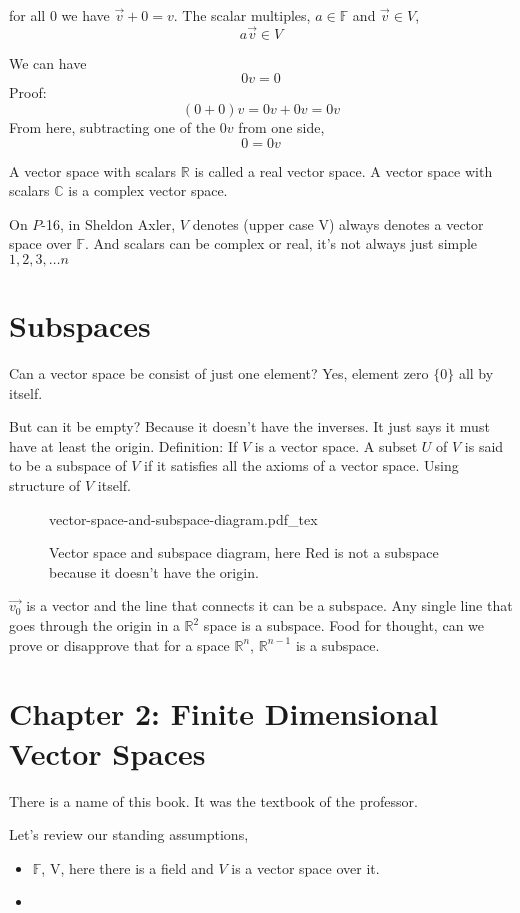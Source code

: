 \documentclass[a4paper]{article}
\newcommand{\incfig}[1]{%
	\def\svgwidth{\columnwidth}
	{#1.pdf_tex}
}
\begin{document}
for all $0$ we have $\vec{v} + 0 = v$. The scalar multiples, $a \in \mathbb{F}$ and $\vec{v} \in V$, 
\[
a \vec{v} \in V
\]

We can have
\[
0 v = 0
\] 
Proof: \[
	\left(0 + 0\right) v = 0v + 0v = 0v
\] 
From here, subtracting one of the $0v$ from one side,
\[
0 = 0 v
\] 

A vector space with scalars $\mathbb{R}$ is called a real vector space. A vector space with scalars $\mathbb{C}$ is a complex vector space.

On $P$-16, in Sheldon Axler, $V$ denotes (upper case V) always denotes a vector space over $\mathbb{F}$. 
And scalars can be complex or real, it's not always just simple $1,2,3, \ldots n$

\section{Subspaces} 
Can a vector space be consist of just one element? Yes, element zero $\{0\}$ all by itself. 

But can it be empty? Because it doesn't have the inverses. It just says it must have at least the origin. 
Definition: If $V$ is a vector space. A subset $U$ of $V$ is said to be a subspace of $V$ if it satisfies all the axioms of a vector space. Using structure of $V$ itself.

\begin{figure}[ht]
    \centering
    \incfig{vector-space-and-subspace-diagram}
    \caption{Vector space and subspace diagram, here Red is not a subspace because it doesn't have the origin.}
    \label{fig:vector-space-and-subspace-diagram}
\end{figure}

$\vec{v_0}$ is a vector and the line that connects it can be a subspace. Any single line that goes through the origin in a $\mathbb{R}^{2}$ space is a subspace. Food for thought, can we prove or disapprove that for a space $\mathbb{R}^{n}$, $\mathbb{R}^{n-1}$ is a subspace.

\newpage
\section{Chapter 2: Finite Dimensional Vector Spaces}
There is a name of this book. It was the textbook of the professor.

Let's review our standing assumptions, 
\begin{itemize}
	\item $\mathbb{F}$, V, here there is a field and $V$ is a vector space over it. 
	\item 
\end{itemize}
\end{document}
